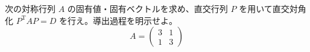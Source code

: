 
次の対称行列 $A$ の固有値・固有ベクトルを求め、直交行列 $P$ を用いて直交対角化 $P^{\mathrm{T}}AP = D$ を行え。導出過程を明示せよ。
\[
A = \begin{pmatrix} 3 & 1 \\ 1 & 3 \end{pmatrix}
\]
